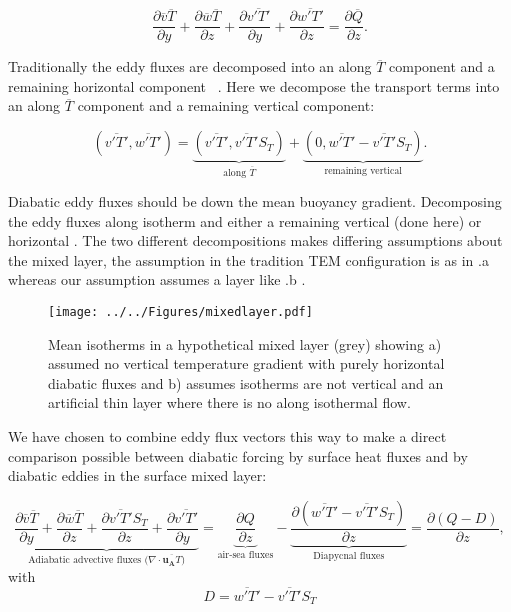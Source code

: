 \begin{equation}
\frac{\partial \overline{v}\overline{T}}{\partial y } + \frac{\partial \overline{w}\overline{T}}{\partial z } + \frac{\partial \overline{v'T'}}{\partial y } + \frac{\partial \overline{w'T'}}{\partial z } = \frac{\partial \overline{Q}}{\partial z}.
\end{equation}

Traditionally the eddy fluxes are decomposed  into an along $\overline{T}$ component and a remaining horizontal component ~\citep{Marshall2003}. Here we decompose the transport terms into an along $\overline{T}$ component and a remaining vertical component:
 
\begin{equation}
\left(\overline{v'T'},\overline{w'T'}\right) =  \underbrace{\left(\overline{v'T'}, \overline{v'T'}S_T\right)}_\text{along $\overline{T}$}  + \underbrace{\left(0,\overline{w'T'} - \overline{v'T'}S_T \right)}_\text{remaining vertical}.
\end{equation}

Diabatic eddy fluxes should be down the mean buoyancy gradient. Decomposing the eddy fluxes along isotherm and either a remaining vertical (done here) or horizontal \citep[as in]{treguier1997}. The two different decompositions makes differing assumptions about the mixed layer, the assumption in the tradition TEM configuration is as in .a whereas our assumption assumes a layer like .b  \citep{Plumb2005}.
\begin{figure}
\center
\noindent \texttt{[image: ../../Figures/mixedlayer.pdf]}
\caption{Mean isotherms in a hypothetical mixed layer (grey) showing a) assumed no vertical temperature gradient with purely horizontal diabatic fluxes and b) assumes isotherms are not vertical and an artificial thin layer where there is no along isothermal flow.   }
\label{fig:mixedlayer}
\end{figure}

We have chosen to combine eddy flux vectors this way to make a direct comparison possible between diabatic forcing by surface heat fluxes and by diabatic eddies in the surface mixed layer:

\begin{equation}
\underbrace{\frac{\partial \overline{v}\overline{T}}{\partial y } + \frac{\partial\overline{w} \overline{T}}{\partial z } + \frac{\partial \overline{v'T'}S_T}{\partial z } + \frac{\partial \overline{v'T'}}{\partial y }}_\text{Adiabatic  advective fluxes ($\nabla \cdot \overline{\textbf{u$_{\textbf{A}}$}T}$)} = \underbrace{\frac{\partial Q}{\partial z}}_\text{air-sea fluxes} - \underbrace{\frac{\partial \left( \overline{w'T'}-\overline{v'T'}S_T \right)}{\partial z }}_\text{Diapycnal fluxes} = \frac{\partial (Q - D)}{\partial z},
\label{eq:cart}
\end{equation}
with
\begin{equation}
D = \overline{w'T'}-\overline{v'T'}S_T 
\end{equation}

